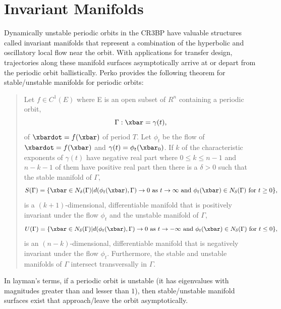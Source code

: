 \section{Invariant Manifolds}
Dynamically unstable periodic orbits in the CR3BP have valuable structures called invariant
manifolds that represent a combination of the hyperbolic and oscillatory local flow near the orbit.
With applications for transfer design, trajectories along these manifold surfaces asymptotically
arrive at or depart from the periodic orbit ballistically. Perko provides the following theorem for
stable/unstable manifolds for periodic orbits\cite{Perko:1991}:
\begin{quote}
    Let $f\in C^{1}(E)$ where E is an open subset of $R^{n}$ containing a periodic orbit,
    \begin{equation}
        \Gamma:\xbar=\gamma(t),
    \end{equation}
    of $\xbardot=f(\xbar)$ of period $T$. Let $\phi_{t}$ be the flow of $\xbardot=f(\xbar)$ and
    $\gamma(t)=\phi_{t}(\xbar_{0})$. If $k$ of the characteristic exponents of $\gamma(t)$ have
    negative real part where $0\leq k\leq n-1$ and $n-k-1$ of them have positive real part then
    there is a $\delta>0$ such that the stable manifold of $\Gamma$,
    \begin{equation}
        S(\Gamma)=\{\xbar\in N_{\delta}(\Gamma)|d(\phi_{t}(\xbar),\Gamma)\rightarrow0\text{ as }t\rightarrow\infty\text{ and }\phi_{t}(\xbar)\in N_{\delta}(\Gamma)\text{ for }t\geq0\},
    \end{equation}
    is a $(k+1)$-dimensional, differentiable manifold that is positively invariant under the flow
    $\phi_{t}$ and the unstable manifold of $\Gamma$,
    \begin{equation}
        U(\Gamma)=\{\xbar\in N_{\delta}(\Gamma)|d(\phi_{t}(\xbar),\Gamma)\rightarrow0\text{ as }t\rightarrow-\infty\text{ and }\phi_{t}(\xbar)\in N_{\delta}(\Gamma)\text{ for }t\leq0\},
    \end{equation}
    is an $(n-k)$-dimensional, differentiable manifold that is negatively invariant under the flow
    $\phi_{t}$. Furthermore, the stable and unstable manifolds of $\Gamma$ intersect transversally
    in $\Gamma$.
\end{quote}
In layman's terms, if a periodic orbit is unstable (it has eigenvalues with magnitudes greater than
and lesser than $1$), then stable/unstable manifold surfaces exist that approach/leave the orbit
asymptotically.

